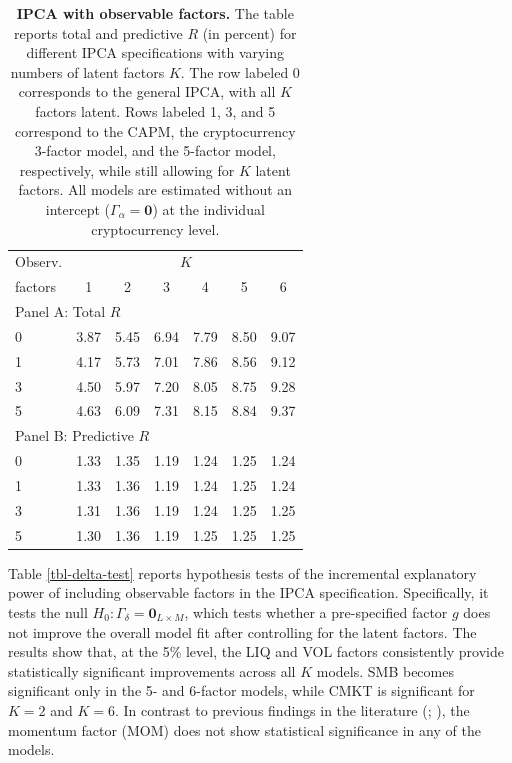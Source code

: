 \documentclass[
  12pt,
  a4paper,
  openany]{scrbook}
\begin{document}
\begin{table}
\centering
\small
\caption[IPCA with observable factors]%
{%
\textbf{IPCA with observable factors.}
The table reports total and predictive $R$ (in percent) for different IPCA specifications with varying numbers of latent factors $K$. The row labeled 0 corresponds to the general IPCA, with all $K$ factors latent. Rows labeled 1, 3, and 5 correspond to the CAPM, the cryptocurrency 3-factor model, and the 5-factor model, respectively, while still allowing for $K$ latent factors. All models are estimated without an intercept ($\Gamma_\alpha = \mathbf{0}$) at the individual cryptocurrency level.
}
\label{tbl-dynamic-models}
\vspace{5pt} %
\begin{tabular}{lcccccc}
\toprule
\multicolumn{1}{c}{Observ.} & \multicolumn{6}{c}{$K$} \\
\cmidrule(lr){2-7}
factors & 1 & 2 & 3 & 4 & 5 & 6 \\
\midrule
\multicolumn{7}{l}{Panel A: Total $R$} \\
\midrule
0 & 3.87 & 5.45 & 6.94 & 7.79 & 8.50 & 9.07 \\ 
1 & 4.17 & 5.73 & 7.01 & 7.86 & 8.56 & 9.12 \\
3 & 4.50 & 5.97 & 7.20 & 8.05 & 8.75 & 9.28 \\
5 & 4.63 & 6.09 & 7.31 & 8.15 & 8.84 & 9.37 \\
\midrule
\multicolumn{7}{l}{Panel B: Predictive $R$} \\
\midrule
0 & 1.33 & 1.35 & 1.19 & 1.24 & 1.25 & 1.24 \\
1 & 1.33 & 1.36 & 1.19 & 1.24 & 1.25 & 1.24 \\
3 & 1.31 & 1.36 & 1.19 & 1.24 & 1.25 & 1.25 \\
5 & 1.30 & 1.36 & 1.19 & 1.25 & 1.25 & 1.25 \\
\bottomrule
\end{tabular}
\end{table}

Table \ref{tbl-delta-test} reports hypothesis tests of the incremental
explanatory power of including observable factors in the IPCA
specification. Specifically, it tests the null
\(H_0:\Gamma_\delta = \mathbf{0}_{L \times M}\), which tests whether a
pre-specified factor \(g\) does not improve the overall model fit after
controlling for the latent factors. The results show that, at the 5\%
level, the LIQ and VOL factors consistently provide statistically
significant improvements across all \(K\) models. SMB becomes
significant only in the 5- and 6-factor models, while CMKT is
significant for \(K=2\) and \(K=6\). In contrast to previous findings in
the literature (;
), the momentum
factor (MOM) does not show statistical significance in any of the
models.
\end{document}
